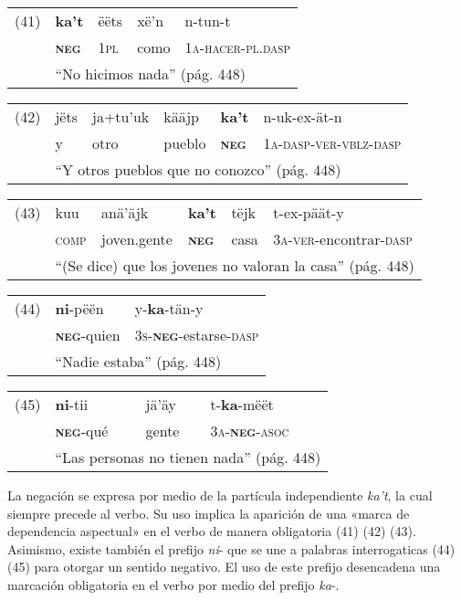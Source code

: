 {\setmainfont{Charis SIL} 

\begin{tabular}{lllll}
(41) & \textbf{ka't} & ëëts & xë'n & n-tun-t \\
& \textsc{\textbf{neg}} & \textsc{1pl} & como & \textsc{1a-hacer-pl.dasp} \\
& \multicolumn{4}{l}{``No hicimos nada'' (pág. 448)}
\end{tabular} \vspace{0.5cm}

\begin{tabular}{llllll}
(42) & jëts & ja+tu'uk & kääjp & \textbf{ka't} & n-uk-ex-ät-n \\
& y & otro & pueblo & \textsc{\textbf{neg}} & \textsc{1a-dasp-ver-vblz-dasp} \\
& \multicolumn{5}{l}{``Y otros pueblos que no conozco'' (pág. 448)}
\end{tabular} \vspace{0.5cm}

\begin{tabular}{llllll}
(43) & kuu & anä'äjk & \textbf{ka't} & tëjk & t-ex-päät-y \\
& \textsc{comp} & joven.gente & \textsc{\textbf{neg}} & casa & \textsc{3a-ver}-encontrar-\textsc{dasp} \\
& \multicolumn{5}{l}{``(Se dice) que los jovenes no valoran la casa'' (pág. 448)}
\end{tabular} \vspace{0.5cm}

\begin{tabular}{lll}
(44) & \textbf{ni}-pëën & y-\textbf{ka}-tän-y \\
& \textsc{\textbf{neg}}-quien & \textsc{3s-\textbf{neg}}-estarse-\textsc{dasp} \\
& \multicolumn{2}{l}{``Nadie estaba'' (pág. 448)}
\end{tabular} \vspace{0.5cm}

\begin{tabular}{llll}
(45) & \textbf{ni}-tii & jä'äy & t-\textbf{ka}-mëët \\
& \textsc{\textbf{neg}}-qué & gente & \textsc{3a-\textbf{neg}-asoc} \\
& \multicolumn{3}{l}{``Las personas no tienen nada'' (pág. 448)}
\end{tabular} \vspace{0.5cm}

}

La negación se expresa por medio de la partícula independiente {\setmainfont{Charis SIL} \textit{ka't}}, la cual siempre precede al verbo. Su uso implica la aparición de una «marca de dependencia aspectual» \textcolor{MidnightBlue}{\citep{mixe}} en el verbo de manera obligatoria (41) (42) (43). Asimismo, existe también el prefijo {\setmainfont{Charis SIL} \textit{ni}-} que se une a palabras interrogaticas (44) (45) para otorgar un sentido negativo. El uso de este prefijo desencadena una marcación obligatoria en el verbo por medio del prefijo {\setmainfont{Charis SIL} \textit{ka}-}.